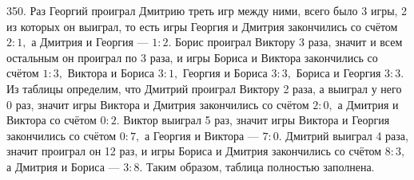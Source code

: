 350. Раз Георгий проиграл Дмитрию треть игр между ними, всего было 3 игры, 2 из которых он выиграл, то есть игры Георгия и Дмитрия закончились со счётом $2:1,$ а Дмитрия и Георгия --- $1:2.$ Борис проиграл Виктору 3 раза, значит и всем остальным он проиграл по 3 раза, и игры Бориса и Виктора закончились со счётом $1:3,$ Виктора и Бориса $3:1,$ Георгия и Бориса $3:3,$ Бориса и Георгия $3:3.$ Из таблицы определим, что Дмитрий проиграл Виктору 2 раза, а выиграл у него 0 раз, значит игры Виктора и Дмитрия закончились со счётом $2:0,$ а Дмитрия и Виктора со счётом $0:2.$ Виктор выиграл 5 раз, значит игры Виктора и Георгия закончились со счётом $0:7,$ а Георгия и Виктора --- $7:0.$ Дмитрий выиграл 4 раза, значит проиграл он 12 раз, и игры Бориса и Дмитрия закончились со счётом $8:3,$ а Дмитрия и Бориса --- $3:8.$ Таким образом, таблица полностью заполнена.\\
\begin{figure}[ht!]
\end{figure}\\
